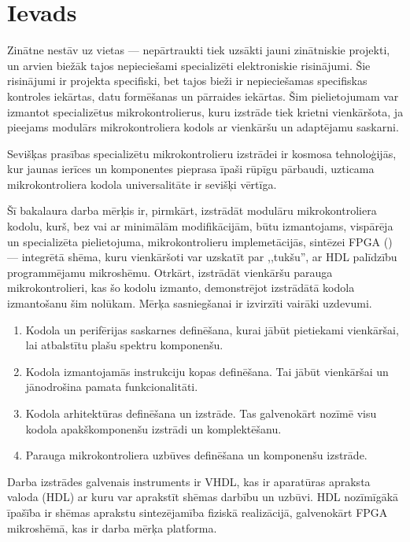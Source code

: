 \section*{Ievads} 
Zinātne nestāv uz vietas --- nepārtraukti tiek uzsākti jauni zinātniskie projekti,
un arvien biežāk tajos nepieciešami specializēti elektroniskie risinājumi.
Šie risinājumi ir projekta specifiski, bet tajos bieži ir nepieciešamas
specifiskas kontroles iekārtas, datu formēšanas un pārraides iekārtas.
Šim pielietojumam var izmantot specializētus mikrokontrolierus, kuru
izstrāde tiek krietni vienkāršota, ja pieejams
modulārs mikrokontroliera kodols ar vienkāršu un adaptējamu saskarni.

Sevišķas prasības specializētu mikrokontrolieru izstrādei ir kosmosa
tehnoloģijās, kur jaunas ierīces un komponentes pieprasa īpaši rūpīgu
pārbaudi, uzticama mikrokontroliera kodola universalitāte ir sevišķi
vērtīga.

Šī bakalaura darba mērķis ir, pirmkārt, izstrādāt modulāru mikrokontroliera kodolu,
kurš, bez vai ar minimālām modifikācijām, būtu izmantojams,
vispārēja un specializēta pielietojuma, mikrokontrolieru implemetācijās,
sintēzei FPGA () ---
integrētā shēma, kuru vienkāršoti var 
uzskatīt par ,,tukšu'', ar HDL palīdzību programmējamu mikroshēmu.
Otrkārt,
izstrādāt vienkāršu parauga mikrokontrolieri, kas šo kodolu izmanto,
demonstrējot izstrādātā kodola izmantošanu šim nolūkam.
Mērķa sasniegšanai ir izvirzīti vairāki uzdevumi.
\begin{enumerate}
	\item Kodola un perifērijas saskarnes definēšana,
		kurai jābūt pietiekami vienkāršai, lai atbalstītu plašu spektru
		komponenšu.
	\item Kodola izmantojamās instrukciju kopas definēšana. Tai jābūt
		vienkāršai un jānodrošina pamata funkcionalitāti.
	\item Kodola arhitektūras definēšana un izstrāde. Tas galvenokārt nozīmē
		visu kodola apakškomponenšu izstrādi un komplektēšanu.
	\item Parauga mikrokontroliera uzbūves definēšana un komponenšu izstrāde.
\end{enumerate}

Darba izstrādes galvenais instruments ir VHDL, kas ir
aparatūras apraksta valoda (HDL) ar kuru var aprakstīt shēmas darbību un uzbūvi.
HDL nozīmīgākā īpašība ir shēmas aprakstu sintezējamība fiziskā realizācijā,
galvenokārt FPGA mikroshēmā, kas ir darba mērķa platforma.


